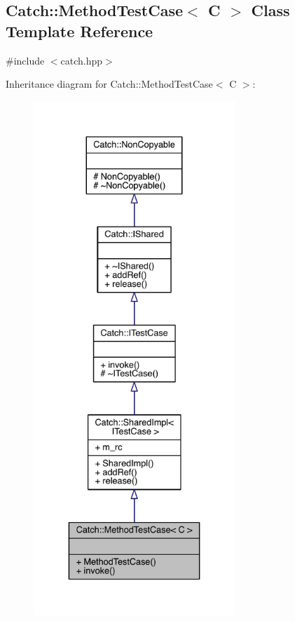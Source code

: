\hypertarget{a00051}{}\subsection{Catch\+:\+:Method\+Test\+Case$<$ C $>$ Class Template Reference}
\label{a00051}


{\ttfamily \#include $<$catch.\+hpp$>$}



Inheritance diagram for Catch\+:\+:Method\+Test\+Case$<$ C $>$\+:\nopagebreak
\begin{figure}[H]
\begin{center}
\leavevmode
\includegraphics[height=550pt]{a00232}
\end{center}
\end{figure}


